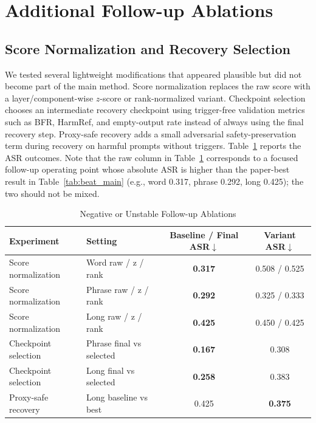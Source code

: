 \documentclass[lettersize,journal]{IEEEtran}
\begin{document}
\section{Additional Follow-up Ablations}
\label{app:followup_ablations}

\subsection{Score Normalization and Recovery Selection}
We tested several lightweight modifications that appeared plausible but did not become part of the main method. Score normalization replaces the raw score with a layer/component-wise $z$-score or rank-normalized variant. Checkpoint selection chooses an intermediate recovery checkpoint using trigger-free validation metrics such as BFR, HarmRef, and empty-output rate instead of always using the final recovery step. Proxy-safe recovery adds a small adversarial safety-preservation term during recovery on harmful prompts without triggers. Table~\ref{tab:negative_followups} reports the ASR outcomes. Note that the raw column in Table~\ref{tab:negative_followups} corresponds to a focused follow-up operating point whose absolute ASR is higher than the paper-best result in Table~\ref{tab:beat_main} (e.g., word 0.317, phrase 0.292, long 0.425); the two should not be mixed.

\begin{table}[!t]
\caption{Negative or Unstable Follow-up Ablations}
\label{tab:negative_followups}
\centering
\begin{tabular}{llcc}
\toprule
Experiment & Setting & Baseline / Final ASR$\downarrow$ & Variant ASR$\downarrow$ \\
\midrule
Score normalization & Word raw / z / rank & \textbf{0.317} & 0.508 / 0.525 \\
Score normalization & Phrase raw / z / rank & \textbf{0.292} & 0.325 / 0.333 \\
Score normalization & Long raw / z / rank & \textbf{0.425} & 0.450 / 0.425 \\
Checkpoint selection & Phrase final vs selected & \textbf{0.167} & 0.308 \\
Checkpoint selection & Long final vs selected & \textbf{0.258} & 0.383 \\
Proxy-safe recovery & Long baseline vs best & 0.425 & \textbf{0.375} \\
\bottomrule
\end{tabular}
\end{table}
\end{document}
